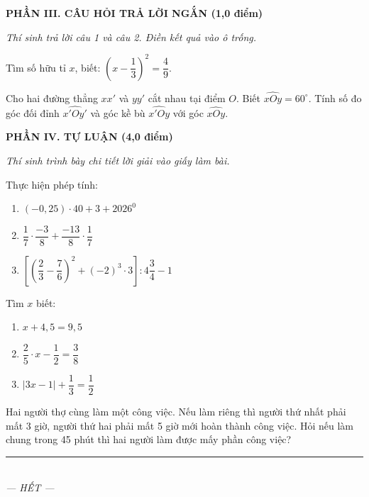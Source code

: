 \documentclass[12pt,a4paper]{article}
\begin{document}
\setcounter{ex}{0}
\noindent\textbf{\large PHẦN III. CÂU HỎI TRẢ LỜI NGẮN (1,0 điểm)}

\textit{Thí sinh trả lời câu 1 và câu 2. Điền kết quả vào ô trống.}

\vspace{1mm}
\begin{ex}
Tìm số hữu tỉ $x$, biết: $\left(x - \dfrac{1}{3}\right)^2 = \dfrac{4}{9}$. 
\end{ex}

\begin{ex}
Cho hai đường thẳng $xx'$ và $yy'$ cắt nhau tại điểm $O$. Biết $\widehat{xOy} = 60^\circ$. Tính số đo góc đối đỉnh $\widehat{x'Oy'}$ và góc kề bù $\widehat{x'Oy}$ với góc $\widehat{xOy}$. 
\end{ex}


\setcounter{ex}{0}
\noindent\textbf{\large PHẦN IV. TỰ LUẬN (4,0 điểm)}

\textit{Thí sinh trình bày chi tiết lời giải vào giấy làm bài.}

\vspace{1mm}
\begin{ex}
Thực hiện phép tính:
\begin{enumerate}[label=\textbf{\alph*)}, leftmargin=0.8cm, itemsep=1pt]
\item $(-0{,}25) \cdot 40 + 3 + 2026^0$
\item $\dfrac{1}{7} \cdot \dfrac{-3}{8} + \dfrac{-13}{8} \cdot \dfrac{1}{7}$
\item $\left[ \left(\dfrac{2}{3} - \dfrac{7}{6}\right)^2 + (-2)^3 \cdot 3 \right] : 4\dfrac{3}{4} - 1$
\end{enumerate}
\end{ex}
\vspace{1.5mm}

\begin{ex}
Tìm $x$ biết:
\begin{enumerate}[label=\textbf{\alph*)}, leftmargin=0.8cm, itemsep=1pt]
\item $x + 4{,}5 = 9{,}5$
\item $\dfrac{2}{5} \cdot x - \dfrac{1}{2} = \dfrac{3}{8}$
\item $|3x - 1| + \dfrac{1}{3} = \dfrac{1}{2}$
\end{enumerate}
\end{ex}
\vspace{1.5mm}

\begin{ex}
Hai người thợ cùng làm một công việc. Nếu làm riêng thì người thứ nhất phải mất 3 giờ, người thứ hai phải mất 5 giờ mới hoàn thành công việc. Hỏi nếu làm chung trong 45 phút thì hai người làm được mấy phần công việc?
\end{ex}
\vspace{1.5mm}


\begin{center}
\rule{4cm}{0.4pt}\\
\textit{--- HẾT ---}
\end{center}
\end{document}
